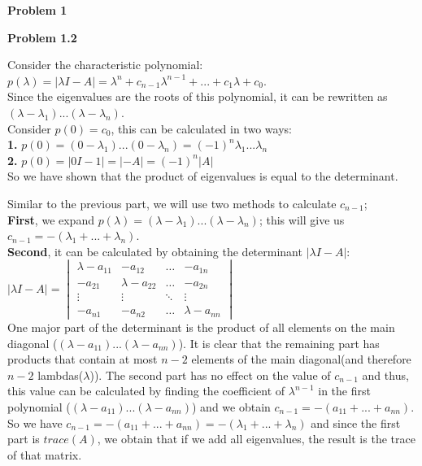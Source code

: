 \documentclass{article}
\newenvironment{problem}[2][Problem]
    { \begin{mdframed}[backgroundcolor=gray!20] \textbf{#1 #2} \\}
    {  \end{mdframed}}
\begin{document}
\begin{problem}{1}
        \begin{problem}{1.2}
            \setcounter{section}{0}
            \begin{section}{}
                \noindent
                Consider the characteristic polynomial: $p(\lambda) = |\lambda I - A| = \lambda^n + c_{n-1}\lambda^{n-1} + ... + c_1\lambda + c_0$. \\
                Since the eigenvalues are the roots of this polynomial, it can be rewritten as $(\lambda - \lambda_1)...(\lambda - \lambda_n)$. \\
                Consider $p(0)=c_0$, this can be calculated in two ways:\\
                \textbf{1. }$p(0) = (0-\lambda_1)...(0-\lambda_n) = (-1)^n\lambda_1...\lambda_n$\\
                \textbf{2. }$p(0) = |0I - 1| = |-A| = (-1)^n|A|$\\
                So we have shown that the product of eigenvalues is equal to the determinant.
            \end{section}
            \begin{section}{}
                \noindent
                Similar to the previous part, we will use two methods to calculate $c_{n-1}$;\\ \textbf{First}, we expand 
                $p(\lambda) = (\lambda - \lambda_1)...(\lambda - \lambda_n)$; this will give us $c_{n-1} = -(\lambda_1+...+\lambda_n)$.\\
                \textbf{Second}, it can be calculated by obtaining the determinant $|\lambda I-A|$:\\
                $|\lambda I-A| = \begin{vmatrix}
                    \lambda-a_{11} & -a_{12} & \dots & -a_{1n}\\
                    -a_{21} & \lambda-a_{22} &\dots & -a_{2n} \\
                    \vdots & \vdots & \ddots & \vdots \\
                    -a_{n1} & -a_{n2} & \hdots & \lambda-a_{nn}
                \end{vmatrix}
                $\\ One major part of the determinant is the product of all elements on the main diagonal ($(\lambda-a_{11})...(\lambda-a_{nn})$).
                It is clear that the remaining part has products that contain at most $n-2$ elements of the main diagonal(and therefore $n-2$ lambdas($\lambda$)).
                The second part has no effect on the value of $c_{n-1}$ and thus, this value can be calculated by finding the coefficient of $\lambda^{n-1}$
                in the first polynomial ($(\lambda-a_{11})...(\lambda-a_{nn})$) and we obtain $c_{n-1} = -(a_{11}+...+a_{nn})$.\\
                So we have $c_{n-1} = -(a_{11}+...+a_{nn}) = -(\lambda_1+...+\lambda_n)$ and since the first part is $trace(A)$, we obtain that
                if we add all eigenvalues, the result is the trace of that matrix.


\end{section}
\end{problem}
\end{problem}
\end{document}
